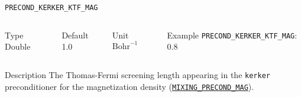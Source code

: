 \documentclass[xcolor=dvipsnames,t]{beamer}
\begin{document}
\begin{frame}[allowframebreaks]{\texttt{PRECOND\_KERKER\_KTF\_MAG}} \label{PRECOND_KERKER_KTF_MAG}
\vspace*{-12pt}
\begin{columns}
\begin{block}{Type}
Double
\end{block}

\begin{block}{Default}
1.0
\end{block}

\begin{block}{Unit}
$\textrm{Bohr}^{-1}$
\end{block}

\begin{block}{Example}
\texttt{PRECOND\_KERKER\_KTF\_MAG}: 0.8
\end{block}
\end{columns}

\begin{block}{Description}
The Thomas-Fermi screening length appearing in the \texttt{kerker} preconditioner for the magnetization density (\hyperlink{MIXING_PRECOND_MAG}{\texttt{MIXING\_PRECOND\_MAG}}). 
\end{block}

\end{frame}
\end{document}
